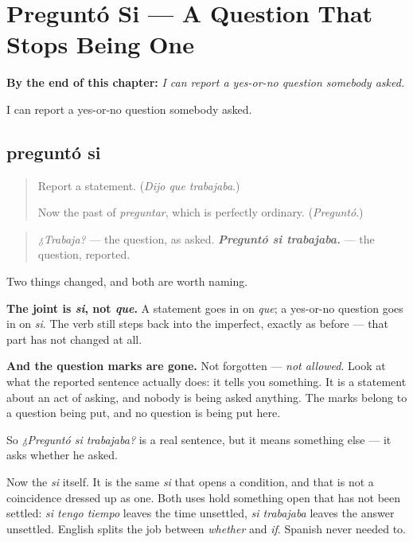 
\chapter{Preguntó Si --- A Question That Stops Being One}
\label{ch:pregunto-si}

\begin{chapteropening}
\textbf{By the end of this chapter:} \emph{I can report a yes-or-no question somebody asked.}

I can report a yes-or-no question somebody asked.
\end{chapteropening}

\section[preguntó si]{preguntó si}

\label{lesson:ES-C57-pregunto-si}



\begin{quote}
Report a statement. (\emph{Dijo que trabajaba}.)

Now the past of \emph{preguntar}, which is perfectly ordinary. (\emph{Preguntó}.)
\end{quote}

\begin{grammarlens}[title={Grammar Lens: a question, reported}]
\begin{quote}
\emph{¿Trabaja?} — the question, as asked. \emph{\textbf{Preguntó si trabajaba.}} — the question, reported.
\end{quote}

Two things changed, and both are worth naming.

\textbf{The joint is \emph{si}, not \emph{que}.} A statement goes in on \emph{que}; a yes-or-no question goes in on \emph{si}. The verb still steps back into the imperfect, exactly as before — that part has not changed at all.
\end{grammarlens}

\begin{culture}
\textbf{And the question marks are gone.} Not forgotten — \emph{not allowed}. Look at what the reported sentence actually does: it tells you something. It is a statement about an act of asking, and nobody is being asked anything. The marks belong to a question being put, and no question is being put here.

So \emph{¿Preguntó si trabajaba?} is a real sentence, but it means something else — it asks whether he asked.

Now the \emph{si} itself. It is the same \emph{si} that opens a condition, and that is not a coincidence dressed up as one. Both uses hold something open that has not been settled: \emph{si tengo tiempo} leaves the time unsettled, \emph{si trabajaba} leaves the answer unsettled. English splits the job between \emph{whether} and \emph{if}. Spanish never needed to.
\end{culture}

